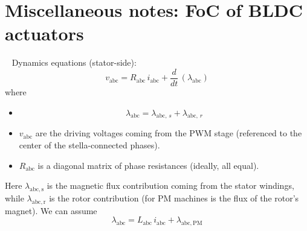\documentclass[letterpaper, 10 pt, conference]{ieeeconf}  %
\begin{document}
\section{Miscellaneous notes: FoC of BLDC actuators}\label{section::bldc_foc}
~\cite{foc::krause2013analysis}
Dynamics equations (stator-side):
\begin{equation}
v_{\mathrm{abc}} = R_{\mathrm{abc}}\,i_{\mathrm{abc}} + \dfrac{d}{dt}\,\left(\lambda_{\mathrm{abc}}\right)
\end{equation}
where
\begin{itemize}
	\item \begin{equation}
	\lambda_{\mathrm{abc}} = \lambda_{\mathrm{abc},\,s} + \lambda_{\mathrm{abc},\,r}
	\end{equation} 
	\item $v_{\mathrm{abc}}$ are the driving voltages coming from the PWM stage (referenced to the center of the stella-connected phases).
	\item $R_{\mathrm{abc}}$ is a diagonal matrix of phase resistances (ideally, all equal). 
\end{itemize}
Here $\lambda_{\mathrm{abc, s}}$ is the magnetic flux contribution coming from the stator windings, while $\lambda_{\mathrm{abc, r}}$ is the rotor contribution (for PM machines is the flux of the rotor's magnet). 
We can assume 
\begin{equation}
\lambda_{\mathrm{abc}} = L_{\mathrm{abc}}\,i_{\mathrm{abc}} + \lambda_{\mathrm{abc, PM}}
\end{equation}
\end{document}
